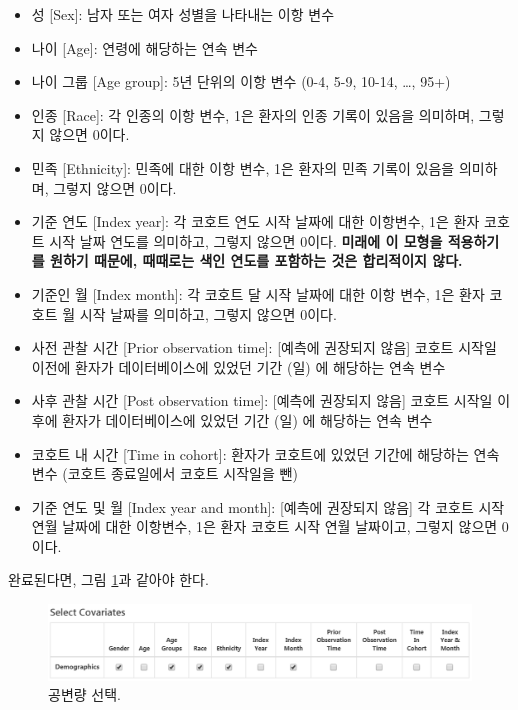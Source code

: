 \documentclass[10.5pt]{book}
\providecommand{\tightlist}{%
  \setlength{\itemsep}{0pt}\setlength{\parskip}{0pt}}
\theoremstyle{definition}
\theoremstyle{definition}
\theoremstyle{definition}
\theoremstyle{remark}
\begin{document}
\begin{itemize}
\tightlist
\item
  성 {[}Sex{]}: 남자 또는 여자 성별을 나타내는 이항 변수
\item
  나이 {[}Age{]}: 연령에 해당하는 연속 변수
\item
  나이 그룹 {[}Age group{]}: 5년 단위의 이항 변수 (0-4, 5-9, 10-14,
  \ldots{}, 95+)
\item
  인종 {[}Race{]}: 각 인종의 이항 변수, 1은 환자의 인종 기록이 있음을
  의미하며, 그렇지 않으면 0이다.
\item
  민족 {[}Ethnicity{]}: 민족에 대한 이항 변수, 1은 환자의 민족 기록이
  있음을 의미하며, 그렇지 않으면 0이다.
\item
  기준 연도 {[}Index year{]}: 각 코호트 연도 시작 날짜에 대한 이항변수,
  1은 환자 코호트 시작 날짜 연도를 의미하고, 그렇지 않으면 0이다.
  \textbf{미래에 이 모형을 적용하기를 원하기 때문에, 때때로는 색인
  연도를 포함하는 것은 합리적이지 않다.}
\item
  기준인 월 {[}Index month{]}: 각 코호트 달 시작 날짜에 대한 이항 변수,
  1은 환자 코호트 월 시작 날짜를 의미하고, 그렇지 않으면 0이다.
\item
  사전 관찰 시간 {[}Prior observation time{]}: {[}예측에 권장되지
  않음{]} 코호트 시작일 이전에 환자가 데이터베이스에 있었던 기간 (일) 에
  해당하는 연속 변수
\item
  사후 관찰 시간 {[}Post observation time{]}: {[}예측에 권장되지 않음{]}
  코호트 시작일 이후에 환자가 데이터베이스에 있었던 기간 (일) 에
  해당하는 연속 변수
\item
  코호트 내 시간 {[}Time in cohort{]}: 환자가 코호트에 있었던 기간에
  해당하는 연속 변수 (코호트 종료일에서 코호트 시작일을 뺀)
\item
  기준 연도 및 월 {[}Index year and month{]}: {[}예측에 권장되지 않음{]}
  각 코호트 시작 연월 날짜에 대한 이항변수, 1은 환자 코호트 시작 연월
  날짜이고, 그렇지 않으면 0이다.
\end{itemize}

완료된다면, 그림 \ref{fig:covariateSettings2}과 같아야 한다.

\begin{figure}

{\centering \includegraphics[width=1\linewidth]{images/PatientLevelPrediction/covariateSettings2} 

}

\caption{공변량 선택.}\label{fig:covariateSettings2}
\end{figure}
\end{document}
